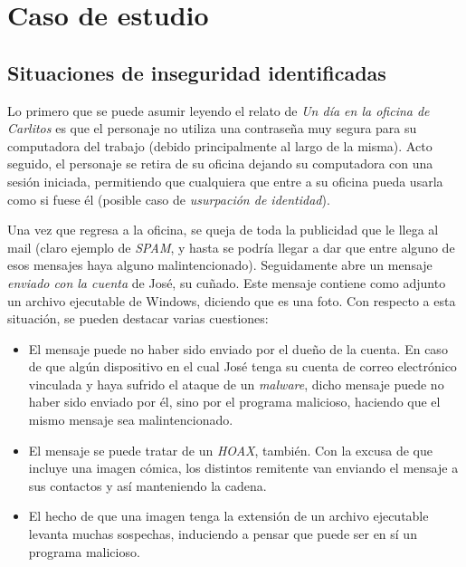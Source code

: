 







\clearpage
\tableofcontents
\clearpage 

\lstset{style=bashstyle}


\section{Caso de estudio}

\subsection{Situaciones de inseguridad identificadas}

Lo primero que se puede asumir leyendo el relato de \emph{Un día en la oficina de Carlitos} es que el personaje no utiliza una contraseña muy segura para su computadora del trabajo (debido principalmente al largo de la misma). Acto seguido, el personaje se retira de su oficina dejando su computadora con una sesión iniciada, permitiendo que cualquiera que entre a su oficina pueda usarla como si fuese él (posible caso de \emph{usurpación de identidad}).

Una vez que regresa a la oficina, se queja de toda la publicidad que le llega al mail (claro ejemplo de \emph{SPAM}, y hasta se podría llegar a dar que entre alguno de esos mensajes haya alguno malintencionado). Seguidamente abre un mensaje \emph{enviado con la cuenta} de José, su cuñado. Este mensaje contiene como adjunto un archivo ejecutable de Windows, diciendo que es una foto. Con respecto a esta situación, se pueden destacar varias cuestiones:

\begin{itemize}
    \item El mensaje puede no haber sido enviado por el dueño de la cuenta. En caso de que algún dispositivo en el cual José tenga su cuenta de correo electrónico vinculada y haya sufrido el ataque de un \emph{malware}, dicho mensaje puede no haber sido enviado por él, sino por el programa malicioso, haciendo que el mismo mensaje sea malintencionado.
    \item El mensaje se puede tratar de un \emph{HOAX}, también. Con la excusa de que incluye una imagen cómica, los distintos remitente van enviando el mensaje a sus contactos y así manteniendo la cadena. 
    \item El hecho de que una imagen tenga la extensión de un archivo ejecutable levanta muchas sospechas, induciendo a pensar que puede ser en sí un programa malicioso.
\end{itemize}

